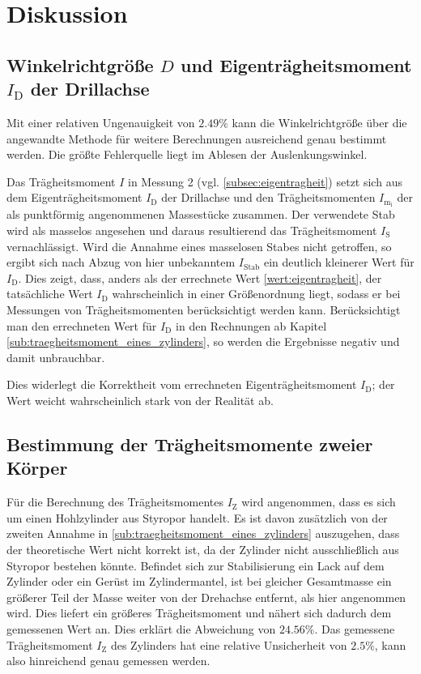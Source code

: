 \section{Diskussion} %
\label{sec:diskussion}

\subsection{Winkelrichtgröße $D$ und Eigenträgheitsmoment $I_\text{D}$ der Drillachse}
\label{Systembestimmend}
Mit einer relativen Ungenauigkeit von $2.49\%$ kann die Winkelrichtgröße über die angewandte Methode für weitere Berechnungen ausreichend genau bestimmt werden. 
Die größte Fehlerquelle liegt im Ablesen der Auslenkungswinkel.

Das Trägheitsmoment $I$ in Messung 2 (vgl. \ref{subsec:eigentragheit}) setzt sich aus dem Eigenträgheitsmoment $I_\text{D}$
der Drillachse und den Trägheitsmomenten $I_\mathup{m_i}$ der als punktförmig angenommenen Massestücke zusammen. 
Der verwendete Stab wird als masselos angesehen und daraus resultierend das Trägheitsmoment $I{_\text{S}}$ vernachlässigt. 
Wird die Annahme eines masselosen Stabes nicht getroffen, so ergibt sich nach Abzug von hier unbekanntem $I_{\text{Stab}}$ ein deutlich kleinerer Wert für $I_{\text{D}}$.
Dies zeigt, dass, anders als der errechnete Wert \eqref{wert:eigentragheit}, der tatsächliche Wert $I_{\text{D}}$ wahrscheinlich in einer Größenordnung liegt, sodass er bei Messungen von Trägheitsmomenten berücksichtigt werden kann. Berücksichtigt man den errechneten Wert für $I_{\text{D}}$ in den Rechnungen ab Kapitel \ref{sub:traegheitsmoment_eines_zylinders}, so werden die Ergebnisse negativ und damit unbrauchbar. 

Dies widerlegt die Korrektheit vom errechneten Eigenträgheitsmoment $I_{\text{D}}$; der Wert weicht wahrscheinlich stark von der Realität ab.

\subsection{Bestimmung der Trägheitsmomente zweier Körper}
Für die Berechnung des Trägheitsmomentes $I_{\text{Z}}$ wird angenommen, dass es sich um einen Hohlzylinder aus Styropor handelt. 
Es ist davon zusätzlich von der zweiten Annahme in \ref{sub:traegheitsmoment_eines_zylinders} auszugehen, dass der theoretische Wert nicht korrekt ist, da der Zylinder nicht ausschließlich aus Styropor bestehen könnte. 
Befindet sich zur Stabilisierung ein Lack auf dem Zylinder oder ein Gerüst im Zylindermantel, ist bei gleicher Gesamtmasse ein größerer Teil der Masse weiter von der Drehachse entfernt, als hier angenommen wird. Dies liefert ein größeres Trägheitsmoment und nähert sich dadurch dem gemessenen Wert an. Dies erklärt die Abweichung von $24.56\%$.%
Das gemessene Trägheitsmoment $I{_\text{Z}}$ des Zylinders hat eine relative Unsicherheit von $2.5\%$, kann also hinreichend genau gemessen werden.

